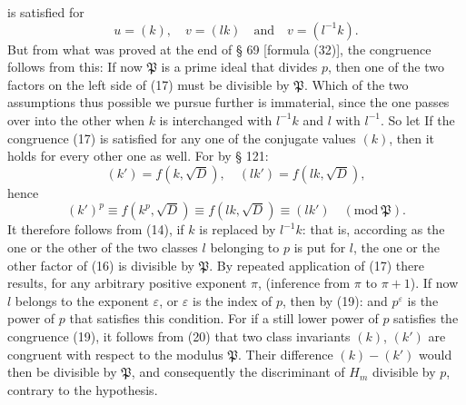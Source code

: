 is satisfied for
\[
u = (k), \quad v = (lk) \quad \text{and} \quad v = (l^{-1}k).
\]
But from what was proved at the end of § 69 [formula
(32)], the congruence follows from this:
If now $\mathfrak P$ is a prime ideal that divides $p$, then one of the
two factors on the left side of (17) %
must be divisible by $\mathfrak P$.
Which of the two assumptions thus possible we pursue further
is immaterial, since the one passes over into the other when
$k$ is interchanged with $l^{-1}k$ and $l$ with $l^{-1}$. So
let
If the congruence (17) is satisfied for any one of the conjugate
values $(k)$, then it holds for every other one as well.
For by § 121:
\[
(k') = f(k, \sqrt{D}), \quad (lk') = f(lk, \sqrt{D}),
\]
hence
\[
(k')^p \equiv f(k^p, \sqrt{D}) \equiv f(lk, \sqrt{D}) \equiv (lk') \quad (\mathrm{mod}\ \mathfrak P).
\]
It therefore follows from (14), %
if $k$ is replaced by $l^{-1}k$:
that is, according as the one or the other of the two classes $l$
belonging to $p$ is put for $l$, the one or the other
factor of (16) is divisible by $\mathfrak P$.
By repeated application of (17) there results, for any
arbitrary positive exponent $\pi$,
(inference from $\pi$ to $\pi + 1$).
If now $l$ belongs to the exponent $\varepsilon$, or $\varepsilon$ is the index of
$p$, then by (19):
and $p^\varepsilon$ is the  power of $p$ that satisfies this
condition. For if a still lower power of $p$ satisfies the congruence (19), %
it follows from (20) that two 
class invariants $(k)$, $(k')$ are congruent with respect to the modulus $\mathfrak P$.
Their difference $(k) - (k')$ would then be divisible by $\mathfrak P$, and consequently the
discriminant of $H_m$ divisible by $p$, contrary to the hypothesis.

